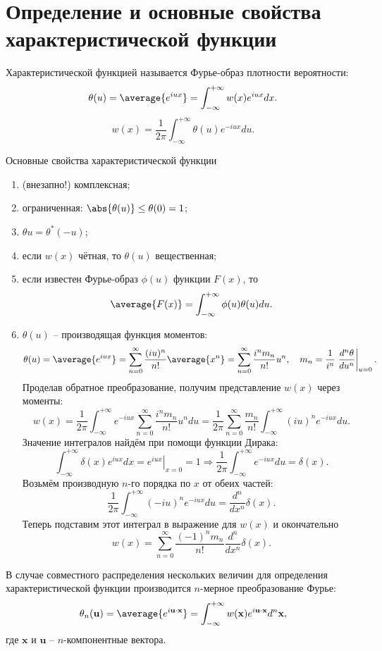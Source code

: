 \section{Определение и основные свойства характеристической функции}

Характеристической функцией называется Фурье-образ плотности вероятности:
\[
    \theta(u) = \average{e^{iux}} = \int_{-\infty}^{+\infty} w(x) e^{iux} dx.
\]
\[
    w(x) = \frac{1}{2\pi}\int_{-\infty}^{+\infty} \theta(u) e^{-iux} du.
\]

Основные свойства характеристической функции
\begin{enumerate}
    \item (внезапно!) комплексная;
    \item ограниченная: \( \abs{\theta(u)} \le \theta(0) = 1 \);
    \item \( \theta{u} = \theta^*(-u) \);
    \item если \( w(x) \) чётная, то \( \theta(u) \) вещественная;
    \item если известен Фурье-образ \( \phi(u) \) функции \( F(x) \), то
        \[
            \average{F(x)} = \int_{-\infty}^{+\infty} \phi(u)\theta(u) du.
        \]
    \item \( \theta(u) \) -- производящая функция моментов:
        \[
            \theta(u) = \average{e^{iux}} =
            \sum_{n=0}^\infty \frac{(iu)^n}{n!}\average{x^n} =
            \sum_{n=0}^\infty \frac{i^n m_n}{n!}u^n,\quad
            m_n = \frac{1}{i^n}\left.\frac{d^n\theta}{du^n}\right|_{u=0}.
        \]
        Проделав обратное преобразование, получим представление \( w(x) \) через
        моменты:
        \[
            w(x) = \frac{1}{2\pi}\int_{-\infty}^{+\infty} e^{-iux}
            \sum_{n=0}^\infty \frac{i^n m_n}{n!}u^n du =
            \frac{1}{2\pi} \sum_{n=0}^\infty \frac{m_n}{n!}
            \int_{-\infty}^{+\infty}(iu)^n e^{-iux} du.
        \]
        Значение интегралов найдём при помощи функции Дирака:
        \[
            \int_{-\infty}^{+\infty} \delta(x) e^{iux} dx =
            \left.e^{iux}\right|_{x=0} = 1 \Rightarrow
            \frac{1}{2\pi}\int_{-\infty}^{+\infty} e^{-iux} du = \delta(x).
        \]
        Возьмём производную \( n \)-го порядка по \( x \) от обеих частей:
        \[
             \frac{1}{2\pi}\int_{-\infty}^{+\infty} (-iu)^n e^{-iux} du =
             \frac{d^n}{dx^n}\delta(x).
        \]
        Теперь подставим этот интеграл в выражение для \( w(x) \) и
        окончательно
        \[
            w(x) =  \sum_{n=0}^\infty \frac{(-1)^n m_n}{n!}
                \frac{d^n}{dx^n}\delta(x).
        \]
\end{enumerate}
В случае совместного распределения нескольких величин для определения
характеристической функции производится \( n \)-мерное преобразование Фурье:
\[
    \theta_n(\textbf{u}) = \average{e^{i\textbf{u}\cdot\textbf{x}}} =
    \int_{-\infty}^{+\infty} w(\textbf{x}) e^{i \textbf{u}\cdot\textbf{x}}
    d^n \textbf{x},
\]
где \( \textbf{x} \) и \( \textbf{u} \) -- \( n \)-компонентные вектора.

